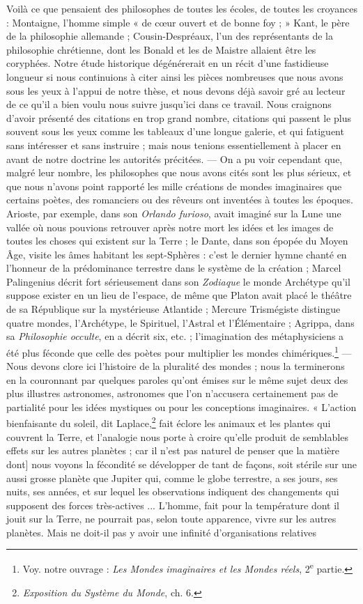 \documentclass[a4paper, 11pt, oneside, landscape]{article}
\begin{document}
Voilà ce que pensaient des philosophes de toutes les écoles, de toutes les croyances : Montaigne, l'homme simple « de cœur ouvert et de bonne foy ; » Kant, le père de la philosophie allemande ; Cousin-Despréaux, l'un des représentants de la philosophie chrétienne, dont les Bonald et les de Maistre allaient être les coryphées. Notre étude historique dégénérerait en un récit d'une fastidieuse longueur si nous continuions à citer ainsi les pièces nombreuses que nous avons sous les yeux à l'appui de notre thèse, et nous devons déjà savoir gré au lecteur de ce qu'il a bien voulu nous suivre jusqu'ici dans ce travail. Nous craignons d'avoir présenté des citations en trop grand nombre, citations qui passent le plus souvent sous les yeux comme les tableaux d'une longue galerie, et qui fatiguent sans intéresser et sans instruire ; mais nous tenions essentiellement à placer en avant de notre doctrine les autorités précitées. --- On a pu voir cependant que, malgré leur nombre, les philosophes que nous avons cités sont les plus sérieux, et que nous n'avons point rapporté les mille créations de mondes imaginaires que certains poètes, des romanciers ou des rêveurs ont inventées à toutes les époques. Arioste, par exemple, dans son \emph{Orlando furioso}, avait imaginé sur la Lune une vallée où nous pouvions retrouver après notre mort les idées et les images de toutes les choses qui existent sur la Terre ; le Dante, dans son épopée du Moyen Âge, visite les âmes habitant les sept-Sphères : c'est le dernier hymne chanté en l'honneur de la prédominance terrestre dans le système de la création ; Marcel Palingenius décrit fort sérieusement dans son \emph{Zodiaque} le monde Archétype qu'il suppose exister en un lieu de l'espace, de même que Platon avait placé le théâtre de sa République sur la mystérieuse Atlantide ; Mercure Trismégiste distingue quatre mondes, l'Archétype, le Spirituel, l'Astral et l'Élémentaire ; Agrippa, dans sa \emph{Philosophie occulte}, en a décrit six, etc. ; l'imagination des métaphysiciens a été plus féconde que celle des poètes pour multiplier les mondes chimériques.\footnote{Voy. notre ouvrage : \emph{Les Mondes imaginaires et les Mondes réels}, 2\textsuperscript{e} partie.} --- Nous devons clore ici l'histoire de la pluralité des mondes ; nous la terminerons en la couronnant par quelques paroles qu'ont émises sur le même sujet deux des plus illustres astronomes, astronomes que l'on n'accusera certainement pas de partialité pour les idées mystiques ou pour les conceptions imaginaires. « L'action bienfaisante du soleil, dit Laplace,\footnote{\emph{Exposition du Système du Monde}, ch. 6.} fait éclore les animaux et les plantes qui couvrent la Terre, et l'analogie nous porte à croire qu'elle produit de semblables effets sur les autres planètes ; car il n'est pas naturel de penser que la matière dont] nous voyons la fécondité se développer de tant de façons, soit stérile sur une aussi grosse planète que Jupiter qui, comme le globe terrestre, a ses jours, ses nuits, ses années, et sur lequel les observations indiquent des changements qui supposent des forces très-actives ... L'homme, fait pour la température dont il jouit sur la Terre, ne pourrait pas, selon toute apparence, vivre sur les autres planètes. Mais ne doit-il pas y avoir une infinité d'organisations relatives 
\end{document}
